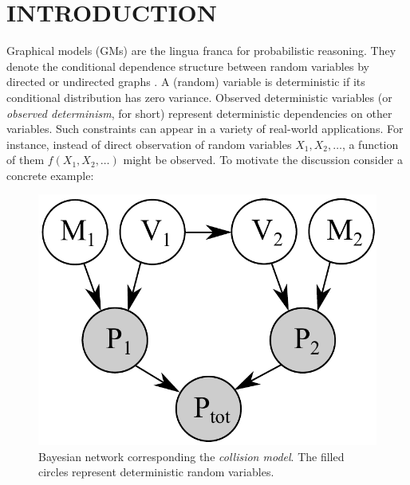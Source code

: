 \section{INTRODUCTION}
\label{sect:intro}
Graphical models (GMs) are the lingua franca for probabilistic reasoning.
They denote the conditional dependence structure between random variables by directed or undirected graphs \citep{koller2009probabilistic}. 
A (random) variable is deterministic if its conditional distribution has zero variance. 
Observed deterministic variables (or \emph{observed determinism}, for short) represent deterministic dependencies on other variables.
Such constraints can appear in a variety of real-world applications.
For instance, instead of direct observation of random variables 
$X_1, X_2, \ldots$, a function of them $f(X_1, X_2, \ldots)$ might be observed. 
To motivate the discussion consider a concrete example:  
\begin{figure}[t!]
\vspace{-3mm}
\begin{center}
 \includegraphics[width=0.33\linewidth]{Figs/little-momentum1.pdf} 
\end{center}
\vspace{-6mm}
\caption{\footnotesize
Bayesian network corresponding the \emph{collision model}. The filled circles represent deterministic random variables.} 
\label{fig:mom0}
\vspace{-2mm}
\end{figure}


